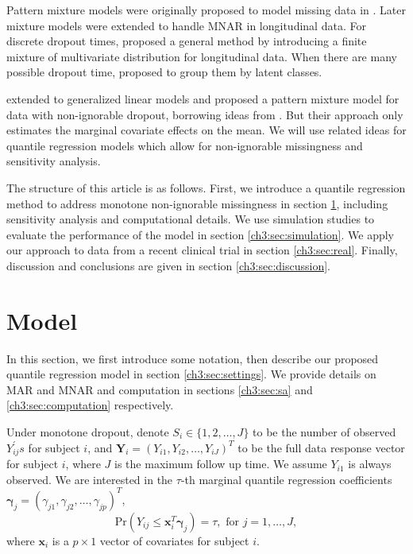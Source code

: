 \documentclass[12pt]{article}
\newcommand{\prob}{\mbox{Pr}}
\begin{document}
Pattern mixture models were originally proposed to model missing data
in \citet{rubin1977}. Later mixture models were extended to handle
MNAR in longitudinal data. For discrete dropout times,
\citet{little1993, little1994} proposed a general method by
introducing a finite mixture of multivariate distribution for
longitudinal data. When there are many possible dropout time,
\citet{roy2003} proposed to group them by latent classes.

\citet{roy2008} extended \citet{roy2003} to generalized linear models
and proposed a pattern mixture model for data with non-ignorable
dropout, borrowing ideas from \citet{heagerty1999}.  But their
approach only estimates the marginal covariate effects on the mean. We
will use related ideas for quantile regression models which allow for
non-ignorable missingness and sensitivity analysis.

The structure of this article is as follows. First, we introduce a
quantile regression method to address monotone non-ignorable
missingness in section \ref{ch3:sec:model}, including sensitivity analysis
and computational details.  We use simulation studies to evaluate the
performance of the model in section \ref{ch3:sec:simulation}. We apply our
approach to data from a recent clinical trial in section
\ref{ch3:sec:real}. Finally, discussion and conclusions are given in
section \ref{ch3:sec:discussion}.

\section{Model}
\label{ch3:sec:model}

In this section, we first introduce some notation, then describe our proposed quantile regression model in section \ref{ch3:sec:settings}.
We provide details on MAR and MNAR and computation in sections \ref{ch3:sec:sa} and \ref{ch3:sec:computation} respectively.

Under monotone dropout, denote $S_i \in \{1, 2, \ldots, J\}$ to be the number of observed $Y_{ij}^{\prime} s$ for subject $i$,
and $\bm Y_i = (Y_{i1}, Y_{i2}, \ldots, Y_{iJ})^{T}$ to be the full data response vector for subject $i$, where $J$ is the maximum follow up time.
We assume $Y_{i1}$ is always observed.
We are interested in the $\tau$-th marginal quantile regression coefficients $\bm \gamma_j = (\gamma_{j1}, \gamma_{j2}, \ldots, \gamma_{jp})^T$,
\begin{equation}\label{eq:marg}
  \prob (Y_{ij} \leq \bm x_i^{T} \bm \gamma_j ) = \tau, \mbox{ for } j = 1, \ldots, J,
\end{equation}
where $\bm x_i$ is a $p \times 1$ vector of covariates for subject
$i$.
\end{document}
